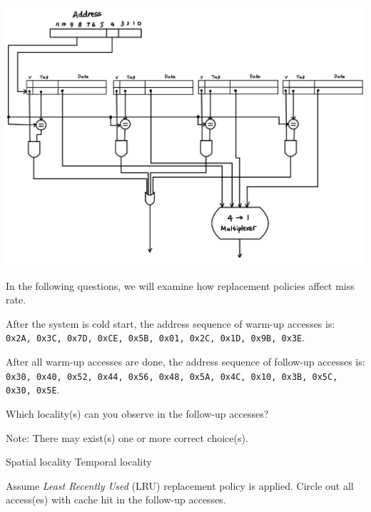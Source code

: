 \begin{questions}
{\begin{solution}
    \includegraphics[scale=0.25]{q2.jpeg}

    \vspace{5in}
    \end{solution}
}
\newpage

In the following questions, we will examine how replacement policies
affect miss rate.

After the system is cold start, the address sequence of warm-up
accesses is:\\
\texttt{0x2A, 0x3C, 0x7D, 0xCE, 0x5B, 0x01, 0x2C, 0x1D, 0x9B, 0x3E}.

After all warm-up accesses are done, the address sequence of
follow-up accesses is: \\
\texttt{0x30, 0x40, 0x52, 0x44, 0x56, 0x48, 0x5A, 0x4C, 0x10, 0x3B,
0x5C, 0x30, 0x5E}.

\question[2] Which locality(s) can you observe in the follow-up
accesses?

{

    \begin{solution}
        Note: There may exist(s) one or more correct choice(s).\\
        \begin{oneparcheckboxes}
            \CorrectChoice Spatial locality
            \CorrectChoice Temporal locality
        \end{oneparcheckboxes}
    \end{solution}

}

\question[2] Assume \emph{Least Recently Used} (LRU) replacement
policy is applied. Circle out all access(es) with cache hit in
the follow-up accesses. \label{q:lru}


\end{questions}
